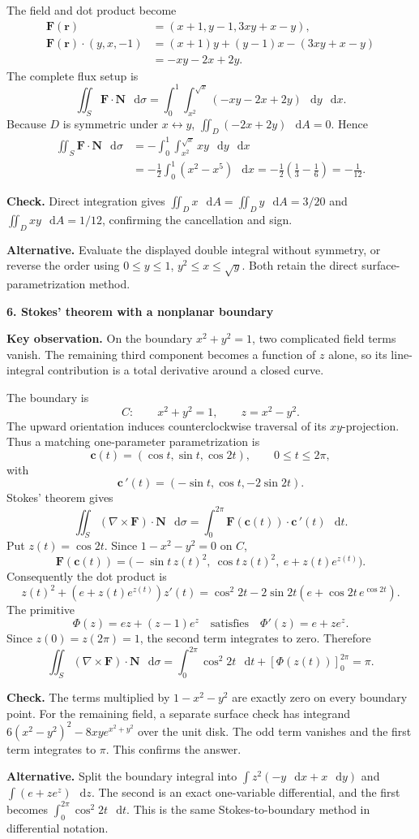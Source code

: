 \documentclass[11pt,letterpaper]{article}
\newcommand{\curl}{\nabla\times}
\renewcommand{\vec}[1]{\mathbf{#1}}
\newcommand{\dd}{\mathop{}\!\mathrm{d}}
\newcommand{\solutionproblem}[3]{%
  \par\bigskip\Needspace{7\baselineskip}
  \noindent\textbf{#1. #2}\par\nobreak
}
\newcommand{\insight}[1]{\par\textbf{Key observation.} #1\par}
\newcommand{\verification}[1]{\par\textbf{Check.} #1\par}
\newcommand{\alternative}[1]{\par\textbf{Alternative.} #1\par}
\begin{document}
The field and dot product become
\[
\begin{aligned}
\vec F(\vec r)&=(x+1,y-1,3xy+x-y),\\
\vec F(\vec r)\cdot(y,x,-1)
&=(x+1)y+(y-1)x-(3xy+x-y)\\
&=-xy-2x+2y.
\end{aligned}
\]
The complete flux setup is
\[
\iint_S\vec F\cdot\vec N\,\dd\sigma
=\int_0^1\int_{x^2}^{\sqrt x}(-xy-2x+2y)\,\dd y\,\dd x.
\]
Because $D$ is symmetric under $x\leftrightarrow y$,
$\iint_D(-2x+2y)\,\dd A=0$. Hence
\[
\begin{aligned}
\iint_S\vec F\cdot\vec N\,\dd\sigma
&=-\int_0^1\int_{x^2}^{\sqrt x}xy\,\dd y\,\dd x\\
&=-\frac12\int_0^1(x^2-x^5)\,\dd x
=-\frac12\left(\frac13-\frac16\right)
=\boxed{-\frac1{12}}.
\end{aligned}
\]
\verification{Direct integration gives
$\iint_D x\,\dd A=\iint_D y\,\dd A=3/20$ and
$\iint_D xy\,\dd A=1/12$, confirming the cancellation and sign.}
\alternative{Evaluate the displayed double integral without symmetry, or
reverse the order using $0\le y\le1$, $y^2\le x\le\sqrt y$. Both
retain the direct surface-parametrization method.}

\solutionproblem{6}{Stokes' theorem with a nonplanar boundary}{20}
\insight{On the boundary $x^2+y^2=1$, two complicated field terms vanish.
The remaining third component becomes a function of $z$ alone, so its
line-integral contribution is a total derivative around a closed curve.}
The boundary is
\[
C:\qquad x^2+y^2=1,\qquad z=x^2-y^2.
\]
The upward orientation induces counterclockwise traversal of its
$xy$-projection. Thus a matching one-parameter parametrization is
\[
\vec c(t)=(\cos t,\sin t,\cos2t),\qquad0\le t\le2\pi,
\]
with
\[
\vec c\,'(t)=(-\sin t,\cos t,-2\sin2t).
\]
Stokes' theorem gives
\[
\iint_S(\curl\vec F)\cdot\vec N\,\dd\sigma
=\int_0^{2\pi}\vec F(\vec c(t))\cdot\vec c\,'(t)\,\dd t.
\]
Put $z(t)=\cos2t$. Since $1-x^2-y^2=0$ on $C$,
\[
\vec F(\vec c(t))
=\bigl(-\sin t\,z(t)^2,\ \cos t\,z(t)^2,\ e+z(t)e^{z(t)}\bigr).
\]
Consequently the dot product is
\[
z(t)^2+(e+z(t)e^{z(t)})z'(t)
=\cos^2 2t-2\sin2t\left(e+\cos2t\,e^{\cos2t}\right).
\]
The primitive
\[
\Phi(z)=ez+(z-1)e^z
\quad\text{satisfies}\quad
\Phi'(z)=e+ze^z.
\]
Since $z(0)=z(2\pi)=1$, the second term integrates to zero. Therefore
\[
\boxed{\displaystyle
\iint_S(\curl\vec F)\cdot\vec N\,\dd\sigma
=\int_0^{2\pi}\cos^2 2t\,\dd t
 +[\Phi(z(t))]_0^{2\pi}=\pi}.
\]
\verification{The terms multiplied by $1-x^2-y^2$ are exactly zero on
every boundary point. For the remaining field, a separate surface check
has integrand $6(x^2-y^2)^2-8xye^{x^2+y^2}$ over the unit disk. The odd
term vanishes and the first term integrates to $\pi$. This confirms the answer.}
\alternative{Split the boundary integral into
$\int z^2(-y\,\dd x+x\,\dd y)$ and
$\int(e+ze^z)\,\dd z$. The second is an exact one-variable differential,
and the first becomes $\int_0^{2\pi}\cos^2 2t\,\dd t$. This is the same
Stokes-to-boundary method in differential notation.}
\end{document}
